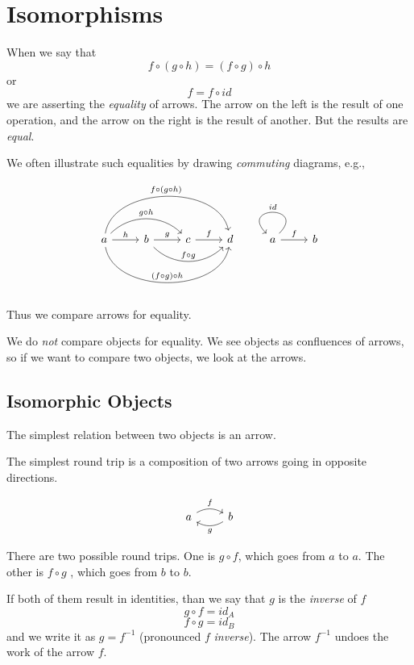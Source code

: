 \documentclass[DaoFP]{subfiles}
\begin{document}
\setcounter{chapter}{2}


\chapter{Isomorphisms}

When we say that 
\[f \circ (g \circ h) = (f \circ g) \circ h \]
or
\[ f = f \circ id \]
we are asserting the \emph{equality} of arrows. The arrow on the left is the result of one operation, and the arrow on the right is the result of another. But the results are \emph{equal}.

We often illustrate such equalities by drawing \emph{commuting} diagrams, e.g.,

\[
 \begin{tikzcd}
 a
 \arrow[r, "h"]
 \arrow[rr, bend left=45, "g \circ h"]
 \arrow[rrr, bend left=80, "f \circ (g \circ h)"]
 \arrow[rrr, bend right=80, "(f \circ g) \circ h"]
 & b
 \arrow[r, "g"]
 \arrow[rr, bend right=45, "f \circ g"]
 &c
 \arrow[r, "f"]
 &d
 \end{tikzcd}
 \begin{tikzcd}
 a
 \arrow[r, "f"]
 \arrow[r, loop, "id"']
 &b
 \end{tikzcd}
\]

Thus we compare arrows for equality.

We do \emph{not} compare objects for equality. We see objects as confluences of arrows, so if we want to compare two objects, we look at the arrows.

\section{Isomorphic Objects}

The simplest relation between two objects is an arrow.

The simplest round trip is a composition of two arrows going in opposite directions. 

\[
 \begin{tikzcd}
 a
 \arrow[r, bend left, "f"]
 & b
 \arrow[l, bend left, "g"]
 \end{tikzcd}
\]

There are two possible round trips. One is $g \circ f$, which goes from $a$ to $a$. The other is $f \circ g$ , which goes from $b$ to $b$.

If both of them result in identities, than we say that $g$ is the \emph{inverse} of $f$
\[ g \circ f = id_A\]
\[f \circ g = id_B\]
and we write it as $g = f^{-1}$ (pronounced $f$ \emph{inverse}). The arrow $ f^{-1}$ undoes the work of the arrow $f$. 
\end{document}
